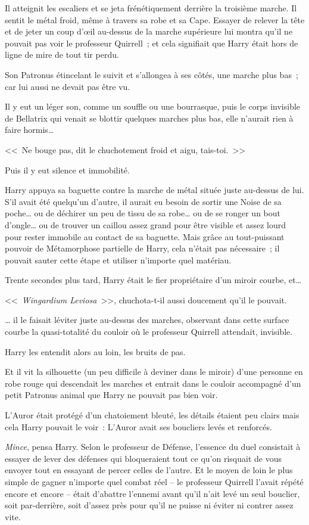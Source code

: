 Il atteignit les escaliers et se jeta frénétiquement derrière la troisième marche. Il sentit le métal froid, même à travers sa robe et sa Cape. Essayer de relever la tête et de jeter un coup d'œil au-dessus de la marche supérieure lui montra qu'il ne pouvait pas voir le professeur Quirrell~; et cela signifiait que Harry était hors de ligne de mire de tout tir perdu.

Son Patronus étincelant le suivit et s'allongea à ses côtés, une marche plus bas~; car lui aussi ne devait pas être vu.

Il y eut un léger son, comme un souffle ou une bourrasque, puis le corps invisible de Bellatrix qui venait se blottir quelques marches plus bas, elle n'aurait rien à faire hormis…

<<~Ne bouge pas, dit le chuchotement froid et aigu, tais-toi.~>>

Puis il y eut silence et immobilité.

Harry appuya sa baguette contre la marche de métal située juste au-dessus de lui. S'il avait été quelqu'un d'autre, il aurait eu besoin de sortir une Noise de sa poche… ou de déchirer un peu de tissu de sa robe… ou de se ronger un bout d'ongle… ou de trouver un caillou assez grand pour être visible et assez lourd pour rester immobile au contact de sa baguette. Mais grâce au tout-puissant pouvoir de Métamorphose partielle de Harry, cela n'était pas nécessaire~; il pouvait sauter cette étape et utiliser n'importe quel matériau.

Trente secondes plus tard, Harry était le fier propriétaire d'un miroir courbe, et…

<<~\emph{Wingardium Leviosa}~>>, chuchota-t-il aussi doucement qu'il le pouvait.

… il le faisait léviter juste au-dessus des marches, observant dans cette surface courbe la quasi-totalité du couloir où le professeur Quirrell attendait, invisible.

Harry les entendit alors au loin, les bruits de pas.

Et il vit la silhouette (un peu difficile à deviner dans le miroir) d'une personne en robe rouge qui descendait les marches et entrait dans le couloir accompagné d'un petit Patronus animal que Harry ne pouvait pas bien voir.

L'Auror était protégé d'un chatoiement bleuté, les détails étaient peu clairs mais cela Harry pouvait le voir~: L'Auror avait ses boucliers levés et renforcés.

\emph{Mince}, pensa Harry. Selon le professeur de Défense, l'essence du duel consistait à essayer de lever des défenses qui bloqueraient tout ce qu'on risquait de vous envoyer tout en essayant de percer celles de l'autre. Et le moyen de loin le plus simple de gagner n'importe quel combat réel -- le professeur Quirrell l'avait répété encore et encore -- était d'abattre l'ennemi avant qu'il n'ait levé un seul bouclier, soit par-derrière, soit d'assez près pour qu'il ne puisse ni éviter ni contrer assez vite.

